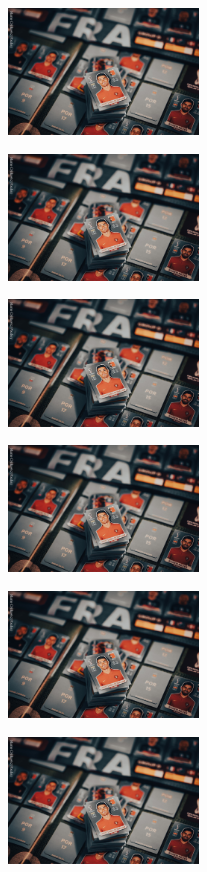 
\includegraphics[width=2.03125in,height=1.32438in]{media/image17.png}

\includegraphics[width=2.03125in,height=1.32438in]{media/image17.png}

\includegraphics[width=2.03125in,height=1.32438in]{media/image17.png}

\includegraphics[width=2.03125in,height=1.32438in]{media/image17.png}

\includegraphics[width=2.03125in,height=1.32438in]{media/image17.png}

\includegraphics[width=2.03125in,height=1.32438in]{media/image17.png}

